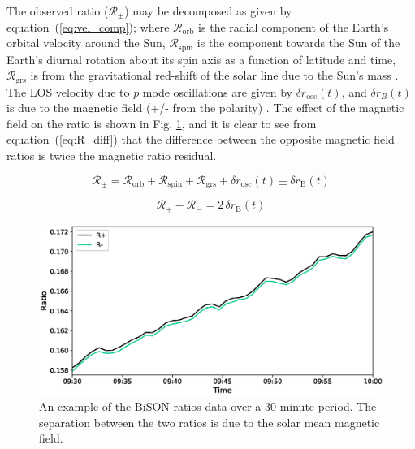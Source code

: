 The observed ratio ($\mathcal{R}_{\pm}$) may be decomposed as given by equation~(\ref{eq:vel_comp}); where $\mathcal{R}_{\mathrm{orb}}$ is the radial component of the Earth's orbital velocity around the Sun, $\mathcal{R}_{\mathrm{spin}}$ is the component towards the Sun of the Earth's diurnal rotation about its spin axis as a function of latitude and time, $\mathcal{R}_{\mathrm{grs}}$ is from the gravitational red-shift of the solar line due to the Sun's mass \citep{elsworth_techniques_1995, dumbill_observation_1999}. The LOS velocity due to $p$ mode oscillations are given by $\delta {r}_{\mathrm{osc}}(t)$, and $\delta {r}_B(t)$ is due to the magnetic field (+/- from the polarity) \citep{dumbill_observation_1999}. The effect of the magnetic field on the ratio is shown in Fig. \ref{fig:ratio_split}, and it is clear to see from equation~(\ref{eq:R_diff}) that the difference between the opposite magnetic field ratios is twice the magnetic ratio residual.

\begin{equation}
\mathcal{R}_{\pm} = \mathcal{R}_{\mathrm{orb}} + \mathcal{R}_{\mathrm{spin}} + \mathcal{R}_{\mathrm{grs}} + \delta {r}_{\mathrm{osc}}(t) \pm \delta {r}_{\mathrm{B}}(t)
\label{eq:vel_comp}
\end{equation}

\begin{equation}
\mathcal{R}_{+} - \mathcal{R}_{-} = 2 \, \delta {r}_{\mathrm{B}}(t)
\label{eq:R_diff}
\end{equation}

\begin{figure}[ht!]
	\includegraphics[width=\columnwidth]{Fred_ratio_zoom.eps}
	\caption{An example of the BiSON ratios data over a 30-minute period. The separation between the two ratios is due to the solar mean magnetic field.}
	\label{fig:ratio_split}
\end{figure}

